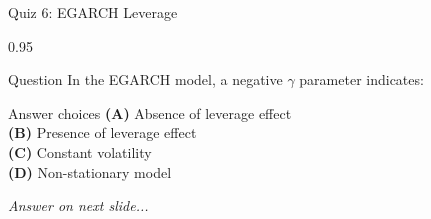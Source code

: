 \documentclass[9pt, aspectratio=169, t]{beamer}
\begin{document}
\begin{frame}{Quiz 6: EGARCH Leverage}
    \begin{cminipage}{0.95\textwidth}
    \begin{alertblock}{Question}
        In the EGARCH model, a negative $\gamma$ parameter indicates:
    \end{alertblock}

    \vspace{0.4cm}

    \begin{block}{Answer choices}
        \textcolor{MainBlue}{\textbf{(A)}} Absence of leverage effect\\[3pt]
        \textcolor{MainBlue}{\textbf{(B)}} Presence of leverage effect\\[3pt]
        \textcolor{MainBlue}{\textbf{(C)}} Constant volatility\\[3pt]
        \textcolor{MainBlue}{\textbf{(D)}} Non-stationary model
    \end{block}

    \vspace{0.5cm}

    \begin{center}
        \textit{Answer on next slide...}
    \end{center}
    \end{cminipage}
\end{frame}
\end{document}
